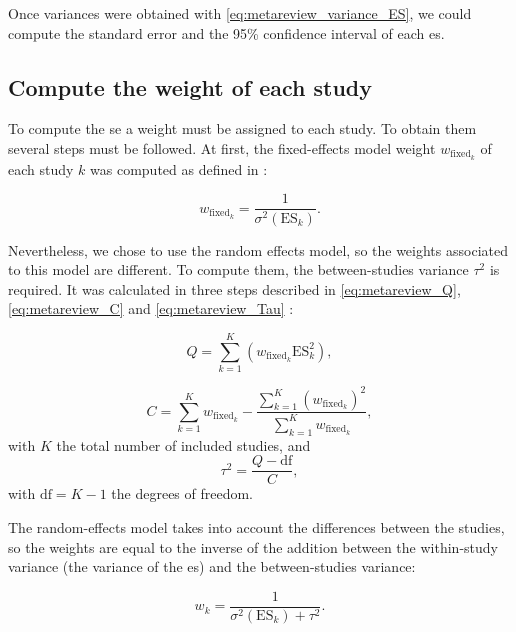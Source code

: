 \documentclass[12pt,a4paper,english]{article}
\begin{document}
Once variances were obtained with \cref{eq:metareview_variance_ES}, we could compute the standard error and the 95\% confidence interval of each \gls{es}. 

\subsection{Compute the weight of each study}

To compute the \gls{se} a weight must be assigned to each study. To obtain them several steps must be followed. At first, the fixed-effects model 
weight $w_{\text{fixed}_k}$ of each study $k$ was computed as defined in \citet{Borenstein2009}: 

\begin{equation}
\label{eq:metareview_weight_fixed_study}
w_{\text{fixed}_k} = \frac{1}{\sigma^2(\text{ES}_k)}.
\end{equation} 

Nevertheless, we chose to use the random effects model, so the weights associated to this model are different. To compute them, the between-studies 
variance $\tau^2$ is required. It was calculated in three steps described in \cref{eq:metareview_Q}, \cref{eq:metareview_C} and \cref{eq:metareview_Tau} 
\citep{Borenstein2009}:

\begin{equation}
\label{eq:metareview_Q}
Q = \sum_{k=1}^{K} (w_{\text{fixed}_k} \text{ES}_k^2),
\end{equation}

\begin{equation}
\label{eq:metareview_C}
C = \sum_{k=1}^{K} w_{\text{fixed}_k} - \frac{ \sum_{k=1}^{K} (w_{\text{fixed}_k})^2 } { \sum_{k=1}^{K} w_{\text{fixed}_k} },
\end{equation}
with $K$ the total number of included studies, and
\begin{equation}
\label{eq:metareview_Tau}
\tau^2 = \frac{Q - \text{df}}{C},
\end{equation}
with $\text{df} = K - 1$ the degrees of freedom.

The random-effects model takes into account the differences between the studies, so the weights are equal to the inverse of the addition between the 
within-study variance (the variance of the \gls{es}) and the between-studies variance:

\begin{equation}
\label{eq:metareview_weight_study}
w_k = \frac{1}{\sigma^2(\text{ES}_k) + \tau^2}.
\end{equation} 
\end{document}
